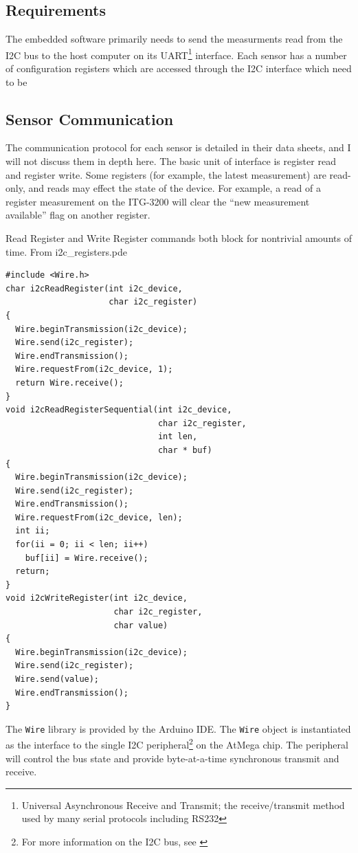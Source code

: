 \documentclass[12pt]{report}
\begin{document}
\subsection{Requirements}
The embedded software primarily needs to send the measurments read from the I2C bus to the host computer on its 
UART\footnote{Universal Asynchronous Receive and Transmit; the receive/transmit method used by many serial protocols including RS232} 
interface. Each sensor has a number of configuration registers which are accessed through the I2C interface which need to be 

\subsection{Sensor Communication}

The communication protocol for each sensor is detailed in their data sheets, and I will not discuss them in depth here. The basic unit of interface is register read and register write. Some registers (for example, the latest measurement) are read-only, and reads may effect the state of the device. For example, a read of a register measurement on the ITG-3200 will clear the ``new measurement available'' flag on another register.   

Read Register and Write Register commands both block for nontrivial amounts of time.
\lstset{language=C++,basicstyle=\ttfamily}
From i2c\_registers.pde
\begin{lstlisting}
#include <Wire.h>
char i2cReadRegister(int i2c_device, 
                     char i2c_register)
{
  Wire.beginTransmission(i2c_device);
  Wire.send(i2c_register);
  Wire.endTransmission();
  Wire.requestFrom(i2c_device, 1);
  return Wire.receive();  
}
void i2cReadRegisterSequential(int i2c_device, 
                               char i2c_register, 
                               int len, 
                               char * buf)
{
  Wire.beginTransmission(i2c_device);
  Wire.send(i2c_register);
  Wire.endTransmission();
  Wire.requestFrom(i2c_device, len);
  int ii;
  for(ii = 0; ii < len; ii++)
    buf[ii] = Wire.receive();
  return;
}
void i2cWriteRegister(int i2c_device, 
                      char i2c_register, 
                      char value)
{
  Wire.beginTransmission(i2c_device);
  Wire.send(i2c_register);
  Wire.send(value);
  Wire.endTransmission();
}  
\end{lstlisting}

The \lstinline$Wire$ library is provided by the Arduino IDE.  The \lstinline$Wire$ object is instantiated as the interface to the single I2C peripheral\footnote{For more information on the I2C bus, see \cite{wikii2c}} on the AtMega chip. The peripheral will control the bus state and provide byte-at-a-time synchronous transmit and receive. 
\end{document}
